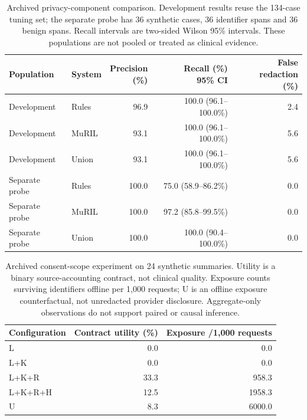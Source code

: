 \begin{table}[!htbp]
\caption{Archived privacy-component comparison. Development results reuse the 134-case tuning set; the separate probe has 36 synthetic cases, 36 identifier spans and 36 benign spans. Recall intervals are two-sided Wilson 95\% intervals. These populations are not pooled or treated as clinical evidence.}
\label{tab:privacy-extension}
\centering\small\setlength{\tabcolsep}{3pt}
\begin{tabular}{@{}llrrr@{}}\toprule
Population & System & \shortstack{Precision\\(\%)} & \shortstack{Recall (\%)\\95\% CI} & \shortstack{False redaction\\(\%)} \\
\midrule
Development & Rules & 96.9 & 100.0 (96.1--100.0\%) & 2.4 \\
\midrule
Development & MuRIL & 93.1 & 100.0 (96.1--100.0\%) & 5.6 \\
\midrule
Development & Union & 93.1 & 100.0 (96.1--100.0\%) & 5.6 \\
\midrule
Separate probe & Rules & 100.0 & 75.0 (58.9--86.2\%) & 0.0 \\
\midrule
Separate probe & MuRIL & 100.0 & 97.2 (85.8--99.5\%) & 0.0 \\
\midrule
Separate probe & Union & 100.0 & 100.0 (90.4--100.0\%) & 0.0 \\
\bottomrule\end{tabular}
\end{table}
\begin{table}[!htbp]
\caption{Archived consent-scope experiment on 24 synthetic summaries. Utility is a binary source-accounting contract, not clinical quality. Exposure counts surviving identifiers offline per 1,000 requests; U is an offline exposure counterfactual, not unredacted provider disclosure. Aggregate-only observations do not support paired or causal inference.}
\label{tab:consent-scope}
\centering\small\begin{tabular}{@{}lrr@{}}\toprule
Configuration & Contract utility (\%) & Exposure /1,000 requests \\
\midrule
L & 0.0 & 0.0 \\
\midrule
L+K & 0.0 & 0.0 \\
\midrule
L+K+R & 33.3 & 958.3 \\
\midrule
L+K+R+H & 12.5 & 1958.3 \\
\midrule
U & 8.3 & 6000.0 \\
\bottomrule\end{tabular}
\end{table}
